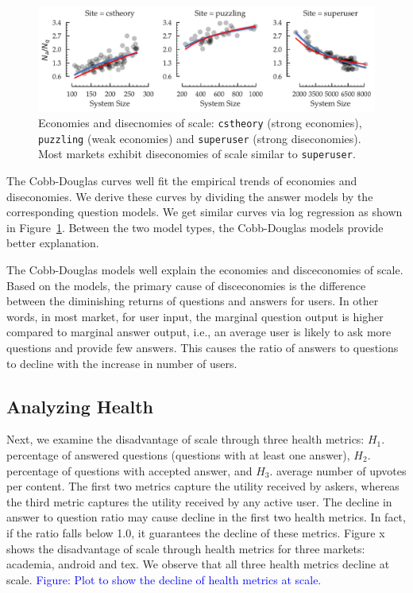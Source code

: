 \begin{figure}[hbt]
\vspace{-0.5\baselineskip}
\centering
\includegraphics[scale=0.38]{Figures/Size_vs_Diseconomy.pdf}
\vspace{-2\baselineskip}
\caption{Economies and disecnomies of scale: \texttt{cstheory} (strong economies), \texttt{puzzling} (weak economies) and \texttt{superuser} (strong diseconomies). Most markets exhibit diseconomies of scale similar to \texttt{superuser}.}
\vspace{-\baselineskip}
\label{fig:diseconomy}
\end{figure}

The Cobb-Douglas curves well fit the empirical trends of economies and diseconomies. We derive these curves by dividing the answer models by the corresponding question models. We get similar curves via log regression as shown in Figure~\ref{fig:diseconomy}. Between the two model types, the Cobb-Douglas models provide better explanation.

The Cobb-Douglas models well explain the economies and disceconomies of scale. Based on the models, the primary cause of disceconomies is the difference between the diminishing returns of questions and answers for users. In other words, in most market, for user input, the marginal question output is higher compared to marginal answer output, i.e., an average user is likely to ask more questions and provide few answers. This causes the ratio of answers to questions to decline with the increase in number of users.

\subsection{Analyzing Health}
Next, we examine the disadvantage of scale through three health metrics: $H_1.$ percentage of answered questions (questions with at least one answer), $H_2.$ percentage of questions with accepted answer, and $H_3$. average number of upvotes per content. The first two metrics capture the utility received by askers, whereas the third metric captures the utility received by any active user. The decline in answer to question ratio may cause decline in the first two health metrics. In fact, if the ratio falls below 1.0, it guarantees the decline of these metrics. Figure x shows the disadvantage of scale through health metrics for three markets: academia, android and tex. We observe that all three health metrics decline at scale. \textcolor{blue}{Figure: Plot to show the decline of health metrics at scale.}

